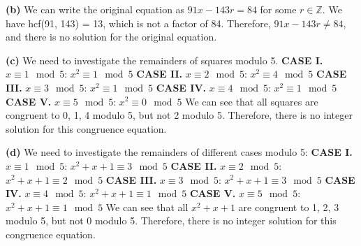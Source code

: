 \documentclass[12pt,letterpaper]{hmcpset}
\begin{document}
\begin{solution} \textbf{(b)} We can write the original equation as $91x - 143r = 84$ for some $r \in \mathbb{Z}$. We have hcf(91, 143) = 13, which is not a factor of 84. Therefore, $91x - 143r \neq 84$, and there is no solution for the original equation. 
\end{solution}

\begin{solution} \textbf{(c)} We need to investigate the remainders of squares modulo 5. 
\newline \textbf{CASE I.} $x\equiv 1 \mod 5$:
$x^{2} \equiv 1\mod 5$
\newline \textbf{CASE II.} $x\equiv 2 \mod 5$:
$x^{2} \equiv 4\mod 5$
\newline \textbf{CASE III.} $x\equiv 3 \mod 5$:
$x^{2} \equiv 1\mod 5$
\newline \textbf{CASE IV.} $x\equiv 4 \mod 5$:
$x^{2} \equiv 1\mod 5$
\newline \textbf{CASE V.} $x\equiv 5 \mod 5$:
$x^{2} \equiv 0\mod 5$
\newline We can see that all squares are congruent to 0, 1, 4 modulo 5, but not 2 modulo 5. Therefore, there is no integer solution for this congruence equation.
\end{solution}

\begin{solution} \textbf{(d)} We need to investigate the remainders of different cases modulo 5:
\newline \textbf{CASE I.} $x\equiv 1 \mod 5$:
$x^{2}+x+1 \equiv 3\mod 5$
\newline \textbf{CASE II.} $x\equiv 2 \mod 5$:
$x^{2}+x+1 \equiv 2\mod 5$
\newline \textbf{CASE III.} $x\equiv 3 \mod 5$:
$x^{2}+x+1 \equiv 3\mod 5$
\newline \textbf{CASE IV.} $x\equiv 4 \mod 5$:
$x^{2}+x+1 \equiv 1\mod 5$
\newline \textbf{CASE V.} $x\equiv 5 \mod 5$:
$x^{2}+x+1 \equiv 1\mod 5$
\newline We can see that all $x^{2}+x+1$ are congruent to 1, 2, 3 modulo 5, but not 0 modulo 5. Therefore, there is no integer solution for this congruence equation.
\end{solution}
\end{document}
